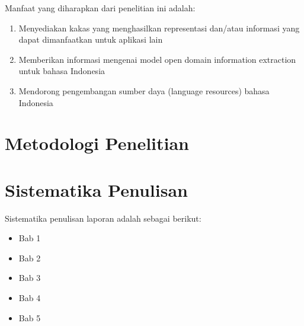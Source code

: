 Manfaat yang diharapkan dari penelitian ini adalah:
\begin{enumerate}
\item Menyediakan kakas yang menghasilkan representasi dan/atau informasi yang dapat dimanfaatkan untuk aplikasi lain
\item Memberikan informasi mengenai model open domain information extraction untuk bahasa Indonesia
\item Mendorong pengembangan sumber daya (language resources) bahasa Indonesia
\end{enumerate}

\section{Metodologi Penelitian}


\section{Sistematika Penulisan}
Sistematika penulisan laporan adalah sebagai berikut:
\begin{itemize}
	\item Bab 1 \babSatu \\
	\item Bab 2 \babDua \\
	\item Bab 3 \babTiga \\
	\item Bab 4 \babEmpat \\
	\item Bab 5 \babLima \\
\end{itemize}


